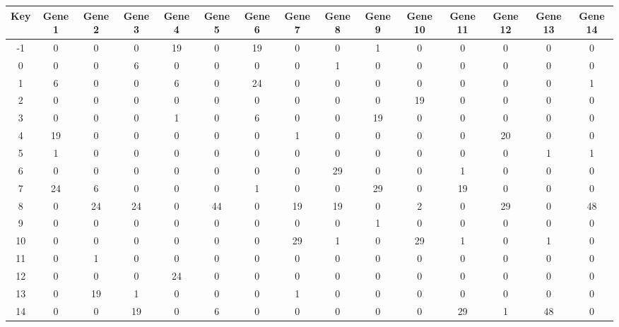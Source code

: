 \begin{tabular}{|c|c|c|c|c|c|c|c|c|c|c|c|c|c|c|}
\hline
Key & Gene 1 & Gene 2 & Gene 3 & Gene 4 & Gene 5 & Gene 6 & Gene 7 & Gene 8 & Gene 9 & Gene 10 & Gene 11 & Gene 12 & Gene 13 & Gene 14 \\
\hline
-1 & 0 & 0 & 0 & 19 & 0 & 19 & 0 & 0 & 1 & 0 & 0 & 0 & 0 & 0 \\
0 & 0 & 0 & 6 & 0 & 0 & 0 & 0 & 1 & 0 & 0 & 0 & 0 & 0 & 0 \\
1 & 6 & 0 & 0 & 6 & 0 & 24 & 0 & 0 & 0 & 0 & 0 & 0 & 0 & 1 \\
2 & 0 & 0 & 0 & 0 & 0 & 0 & 0 & 0 & 0 & 19 & 0 & 0 & 0 & 0 \\
3 & 0 & 0 & 0 & 1 & 0 & 6 & 0 & 0 & 19 & 0 & 0 & 0 & 0 & 0 \\
4 & 19 & 0 & 0 & 0 & 0 & 0 & 1 & 0 & 0 & 0 & 0 & 20 & 0 & 0 \\
5 & 1 & 0 & 0 & 0 & 0 & 0 & 0 & 0 & 0 & 0 & 0 & 0 & 1 & 1 \\
6 & 0 & 0 & 0 & 0 & 0 & 0 & 0 & 29 & 0 & 0 & 1 & 0 & 0 & 0 \\
7 & 24 & 6 & 0 & 0 & 0 & 1 & 0 & 0 & 29 & 0 & 19 & 0 & 0 & 0 \\
8 & 0 & 24 & 24 & 0 & 44 & 0 & 19 & 19 & 0 & 2 & 0 & 29 & 0 & 48 \\
9 & 0 & 0 & 0 & 0 & 0 & 0 & 0 & 0 & 1 & 0 & 0 & 0 & 0 & 0 \\
10 & 0 & 0 & 0 & 0 & 0 & 0 & 29 & 1 & 0 & 29 & 1 & 0 & 1 & 0 \\
11 & 0 & 1 & 0 & 0 & 0 & 0 & 0 & 0 & 0 & 0 & 0 & 0 & 0 & 0 \\
12 & 0 & 0 & 0 & 24 & 0 & 0 & 0 & 0 & 0 & 0 & 0 & 0 & 0 & 0 \\
13 & 0 & 19 & 1 & 0 & 0 & 0 & 1 & 0 & 0 & 0 & 0 & 0 & 0 & 0 \\
14 & 0 & 0 & 19 & 0 & 6 & 0 & 0 & 0 & 0 & 0 & 29 & 1 & 48 & 0 \\
\hline
\end{tabular}
